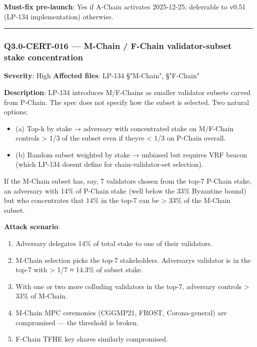 \documentclass[
]{article}
\providecommand{\tightlist}{%
  \setlength{\itemsep}{0pt}\setlength{\parskip}{0pt}}
\begin{document}
\textbf{Must-fix pre-launch}: Yes if A-Chain activates 2025-12-25;
deferrable to v0.51 (LP-134 implementation) otherwise.

\begin{center}\rule{0.5\linewidth}{0.5pt}\end{center}

\subsubsection{Q3.0-CERT-016 --- M-Chain / F-Chain validator-subset
stake
concentration}\label{q30-cert-016--m-chain--f-chain-validator-subset-stake-concentration}

\textbf{Severity}: High \textbf{Affected files}: LP-134 §"M-Chain",
§"F-Chain"

\textbf{Description}: LP-134 introduces M/F-Chains as smaller validator
subsets carved from P-Chain. The spec does not specify how the subset is
selected. Two natural options:

\begin{itemize}
\tightlist
\item
  (a) Top-k by stake → adversary with concentrated stake on M/F-Chain
  controls \textgreater{} 1/3 of the subset even if
  they\textquotesingle re \textless{} 1/3 on P-Chain overall.
\item
  (b) Random subset weighted by stake → unbiased but requires VRF beacon
  (which LP-134 doesn\textquotesingle t define for chain-validator-set
  selection).
\end{itemize}

If the M-Chain subset has, say, 7 validators chosen from the top-7
P-Chain stake, an adversary with 14\% of P-Chain stake (well below the
33\% Byzantine bound) but who concentrates that 14\% in the top-7 can be
\textgreater{} 33\% of the M-Chain subset.

\textbf{Attack scenario}:

\begin{enumerate}
\def\labelenumi{\arabic{enumi}.}
\tightlist
\item
  Adversary delegates 14\% of total stake to one of their validators.
\item
  M-Chain selection picks the top-7 stakeholders.
  Adversary\textquotesingle s validator is in the top-7 with
  \textgreater{} 1/7 ≈ 14.3\% of subset stake.
\item
  With one or two more colluding validators in the top-7, adversary
  controls \textgreater{} 33\% of M-Chain.
\item
  M-Chain MPC ceremonies (CGGMP21, FROST, Corona-general) are
  compromised --- the threshold is broken.
\item
  F-Chain TFHE key shares similarly compromised.
\end{enumerate}
\end{document}
